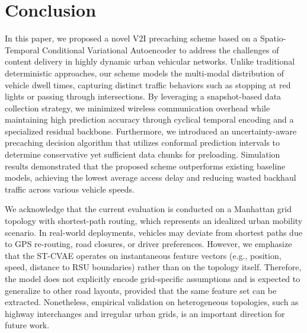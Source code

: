 \documentclass[journal]{IEEEtran}
\begin{document}
\section{Conclusion} \label{sec.c}
In this paper, we proposed a novel V2I precaching scheme based on a Spatio-Temporal Conditional Variational Autoencoder to address the challenges of content delivery in highly dynamic urban vehicular networks.
Unlike traditional deterministic approaches, our scheme models the multi-modal distribution of vehicle dwell times, capturing distinct traffic behaviors such as stopping at red lights or passing through intersections.
By leveraging a snapshot-based data collection strategy, we minimized wireless communication overhead while maintaining high prediction accuracy through cyclical temporal encoding and a specialized residual backbone.
Furthermore, we introduced an uncertainty-aware precaching decision algorithm that utilizes conformal prediction intervals to determine conservative yet sufficient data chunks for preloading.
Simulation results demonstrated that the proposed scheme outperforms existing baseline models, achieving the lowest average access delay and reducing wasted backhaul traffic across various vehicle speeds.

We acknowledge that the current evaluation is conducted on a Manhattan grid topology with shortest-path routing, which represents an idealized urban mobility scenario.
In real-world deployments, vehicles may deviate from shortest paths due to GPS re-routing, road closures, or driver preferences.
However, we emphasize that the ST-CVAE operates on instantaneous feature vectors (e.g., position, speed, distance to RSU boundaries) rather than on the topology itself.
Therefore, the model does not explicitly encode grid-specific assumptions and is expected to generalize to other road layouts, provided that the same feature set can be extracted.
Nonetheless, empirical validation on heterogeneous topologies, such as highway interchanges and irregular urban grids, is an important direction for future work.
\end{document}
